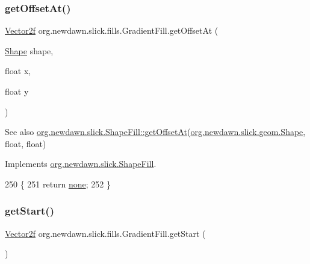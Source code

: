 \subsubsection{\texorpdfstring{get\+Offset\+At()}{getOffsetAt()}}
{\footnotesize\ttfamily \mbox{\hyperlink{classorg_1_1newdawn_1_1slick_1_1geom_1_1_vector2f}{Vector2f}} org.\+newdawn.\+slick.\+fills.\+Gradient\+Fill.\+get\+Offset\+At (\begin{DoxyParamCaption}\item[{\mbox{\hyperlink{classorg_1_1newdawn_1_1slick_1_1geom_1_1_shape}{Shape}}}]{shape,  }\item[{float}]{x,  }\item[{float}]{y }\end{DoxyParamCaption})\hspace{0.3cm}{\ttfamily [inline]}}

\begin{DoxySeeAlso}{See also}
\mbox{\hyperlink{interfaceorg_1_1newdawn_1_1slick_1_1_shape_fill_a69e6925507e29563315971c2bc326767}{org.\+newdawn.\+slick.\+Shape\+Fill\+::get\+Offset\+At}}(\mbox{\hyperlink{classorg_1_1newdawn_1_1slick_1_1geom_1_1_shape}{org.\+newdawn.\+slick.\+geom.\+Shape}}, float, float) 
\end{DoxySeeAlso}


Implements \mbox{\hyperlink{interfaceorg_1_1newdawn_1_1slick_1_1_shape_fill_a69e6925507e29563315971c2bc326767}{org.\+newdawn.\+slick.\+Shape\+Fill}}.


\begin{DoxyCode}
250                                                                \{
251         \textcolor{keywordflow}{return} \mbox{\hyperlink{classorg_1_1newdawn_1_1slick_1_1fills_1_1_gradient_fill_aa0146d319086d1ebae9ad675fee8e742}{none}};
252     \}
\end{DoxyCode}
\mbox{\label{classorg_1_1newdawn_1_1slick_1_1fills_1_1_gradient_fill_aae81c36533f0e665645c7c5be5084be5}} 
\subsubsection{\texorpdfstring{get\+Start()}{getStart()}}
{\footnotesize\ttfamily \mbox{\hyperlink{classorg_1_1newdawn_1_1slick_1_1geom_1_1_vector2f}{Vector2f}} org.\+newdawn.\+slick.\+fills.\+Gradient\+Fill.\+get\+Start (\begin{DoxyParamCaption}{ }\end{DoxyParamCaption})\hspace{0.3cm}{\ttfamily [inline]}}

